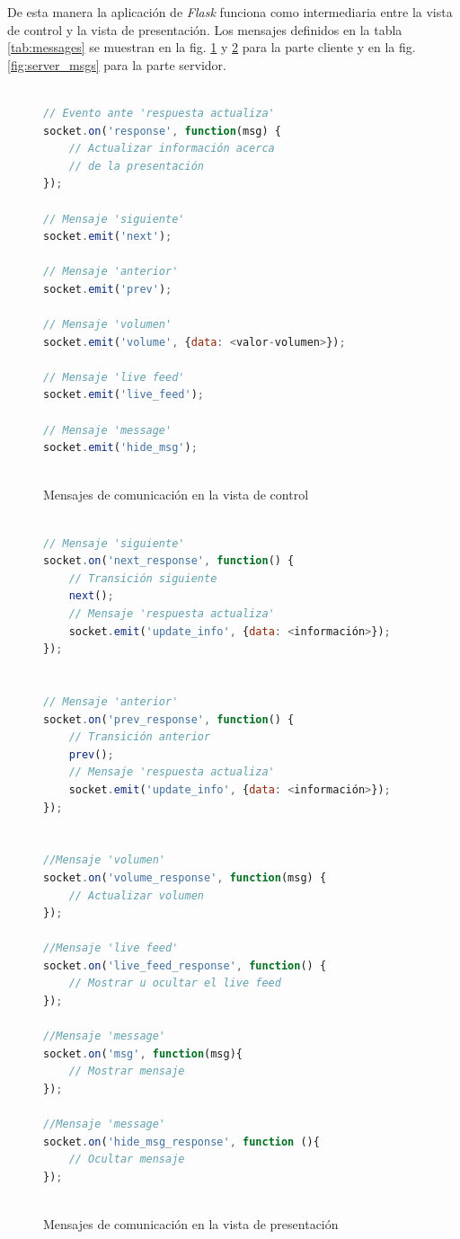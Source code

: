 				De esta manera la aplicación de \textit{Flask} funciona como intermediaria entre la vista de control y la vista de presentación. Los mensajes definidos en la tabla \ref{tab:messages} se muestran en la fig. \ref{fig:control_view_msgs} y \ref{fig:presentation_view_msgs} para la parte cliente y en la fig. \ref{fig:server_msgs} para la parte servidor.


			\begin{figure}[htb]%
				\begin{lstlisting}[language=JavaScript]%

// Evento ante 'respuesta actualiza'
socket.on('response', function(msg) {
    // Actualizar información acerca 
    // de la presentación
}); 

// Mensaje 'siguiente'
socket.emit('next');

// Mensaje 'anterior'
socket.emit('prev');

// Mensaje 'volumen'
socket.emit('volume', {data: <valor-volumen>});

// Mensaje 'live feed'
socket.emit('live_feed');

// Mensaje 'message'
socket.emit('hide_msg');
  
				\end{lstlisting}
			\caption{Mensajes de comunicación en la vista de control}
			\label{fig:control_view_msgs}
			\end{figure}

			\begin{figure}[htb]%
				\begin{lstlisting}[language=JavaScript]%

// Mensaje 'siguiente'
socket.on('next_response', function() {
	// Transición siguiente
	next();
	// Mensaje 'respuesta actualiza'
	socket.emit('update_info', {data: <información>});
});


// Mensaje 'anterior'
socket.on('prev_response', function() {
	// Transición anterior
	prev();
	// Mensaje 'respuesta actualiza'
	socket.emit('update_info', {data: <información>});
});


//Mensaje 'volumen'
socket.on('volume_response', function(msg) {
	// Actualizar volumen
});

//Mensaje 'live feed'
socket.on('live_feed_response', function() {
    // Mostrar u ocultar el live feed
});

//Mensaje 'message'
socket.on('msg', function(msg){
	// Mostrar mensaje
});

//Mensaje 'message'
socket.on('hide_msg_response', function (){
	// Ocultar mensaje
}); 
  
				\end{lstlisting}
			\caption{Mensajes de comunicación en la vista de presentación}
			\label{fig:presentation_view_msgs}
			\end{figure}

